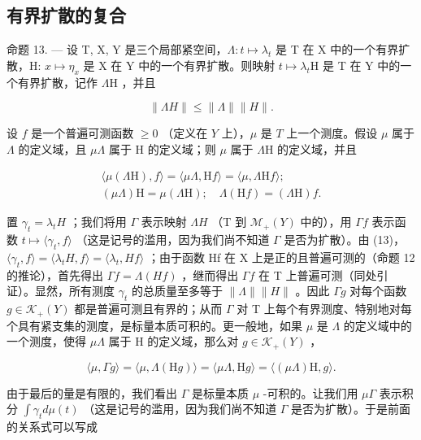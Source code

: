 \subsection{有界扩散的复合}

命题 13. --- 设 T, X, Y 是三个局部紧空间，\(\Lambda : t \mapsto \lambda_t\) 是 T 在 X 中的一个有界扩散，H: \(x \mapsto \eta_x\) 是 X 在 Y 中的一个有界扩散。则映射 \(t \mapsto \lambda_t\mathrm{H}\) 是 T 在 Y 中的一个有界扩散，记作 \(\Lambda\mathrm{H}\) ，并且

\[
\| \Lambda H \| \leqslant \| \Lambda \| \| H \|.\tag{14}
\]

设 \(f\) 是一个普遍可测函数 \(\geqslant 0\) （定义在 \(Y\) 上），\(\mu\) 是 \(T\) 上一个测度。假设 \(\mu\) 属于 \(\Lambda\) 的定义域，且 \(\mu \Lambda\) 属于 H 的定义域；则 \(\mu\) 属于 \(\Lambda \mathrm{H}\) 的定义域，并且

\[
\begin{array}{l} \langle \mu (\Lambda \mathrm{H}), f \rangle = \langle \mu \Lambda , \mathrm{H} f \rangle = \langle \mu , \Lambda \mathrm{H} f \rangle ; \\ (\mu \Lambda) \mathrm{H} = \mu (\Lambda \mathrm{H}); \quad \Lambda (\mathrm{H} f) = (\Lambda \mathrm{H}) f. \end{array}\tag{15}
\]

置 \(\gamma_{t} = \lambda_{t}H\) ；我们将用 \(\Gamma\) 表示映射 \(\Lambda H\) （T 到 \(\mathcal{M}_{+}(Y)\) 中的），用 \(\Gamma f\) 表示函数 \(t \mapsto \langle \gamma_{t}, f \rangle\) （这是记号的滥用，因为我们尚不知道 \(\Gamma\) 是否为扩散）。由 (13)，\(\langle \gamma_{t}, f \rangle = \langle \lambda_{t}H, f \rangle = \langle \lambda_{t}, Hf \rangle\) ；由于函数 Hf 在 X 上是正的且普遍可测的（命题 12 的推论），首先得出 \(\Gamma f = \Lambda(Hf)\) ，继而得出 \(\Gamma f\) 在 T 上普遍可测（同处引证）。显然，所有测度 \(\gamma_{t}\) 的总质量至多等于 \(\|\Lambda\| \|H\|\) 。因此 \(\Gamma g\) 对每个函数 \(g \in \mathcal{K}_{+}(Y)\) 都是普遍可测且有界的；从而 \(\Gamma\) 对 T 上每个有界测度、特别地对每个具有紧支集的测度，是标量本质可积的。更一般地，如果 \(\mu\) 是 \(\Lambda\) 的定义域中的一个测度，使得 \(\mu\Lambda\) 属于 H 的定义域，那么对 \(g \in \mathcal{K}_{+}(Y)\) ，

\[
\langle \mu , \Gamma g \rangle = \langle \mu , \Lambda (\mathrm{H} g) \rangle = \langle \mu \Lambda , \mathrm{H} g \rangle = \langle (\mu \Lambda) \mathrm{H}, g \rangle .
\]

由于最后的量是有限的，我们看出 \(\Gamma\) 是标量本质 \(\mu\) -可积的。让我们用 \(\mu\Gamma\) 表示积分 \(\int\gamma_{t}d\mu(t)\) （这是记号的滥用，因为我们尚不知道 \(\Gamma\) 是否为扩散）。于是前面的关系式可以写成

